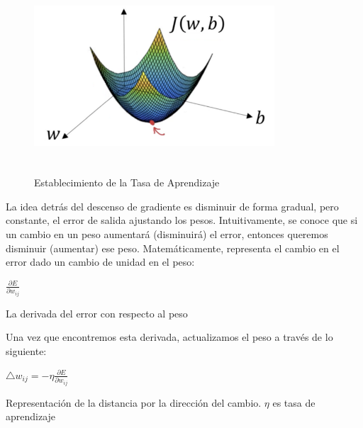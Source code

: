 		\begin{figure}[H]
		\begin{center}
		\includegraphics[width=0.8\textwidth,height=6.5cm]{images/desarrollo/entrenamiento/gradient}
		\end{center}
		\begin{center}
		\caption{\small{Establecimiento de la Tasa de Aprendizaje}}
		\vspace{-0.5em}
		{\small{\citep{gradientimg}}}
		\end{center}
		\vspace{-1.5em}
		\end{figure}
		

		La idea detrás del descenso de gradiente es disminuir de forma gradual, pero constante, el error de salida ajustando los pesos. Intuitivamente, se conoce que si un cambio en un peso aumentará (disminuirá) el error, entonces queremos disminuir (aumentar) ese peso. Matemáticamente, representa el cambio en el error dado un cambio de unidad en el peso:

		\begingroup\makeatletter{}\check@mathfonts
		\begin{center}
		$ \frac{{\partial E}}{\partial w_{ij}}$
		\end{center}
		\begin{center}
		{\small{La derivada del error con respecto al peso}}
		\end{center}
		\endgroup
		
		Una vez que encontremos esta derivada, actualizamos el peso a través de lo siguiente:

		\begingroup\makeatletter{}\check@mathfonts
		\begin{center}
		$  \triangle w_{ij} = -\eta\frac{{\partial E}}{\partial w_{ij}} $
		\end{center}
		\begin{center}
		{\small{Representación de la distancia por la dirección del cambio. $\eta$  es tasa de aprendizaje}}
		\end{center}
		\endgroup

